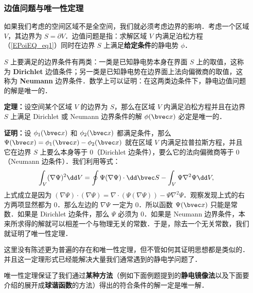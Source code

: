\subsubsection{边值问题与唯一性定理}
如果我们考虑的空间区域不是全空间，我们就必须考虑边界的影响．考虑一个区域 $V$，其边界为 $S=\partial V$．边值问题是指：求解区域 $V$ 内满足泊松方程（\autoref{EPoiEQ_eq1}）同时在边界 $S$ 上满足\textbf{给定条件}的静电势 $\phi$．

$S$ 上要满足的边界条件有两类：一类是已知静电势本身在界面 $S$
上的取值，这称为 \textbf{Dirichlet} 边值条件；另一类是已知静电势在边界面上法向偏微商的取值，这称为 \textbf{Neumann} 边界条件．数学上可以证明：在这两类边条件下，静电边值问题的解是唯一的．

\textbf{定理：}设空间某个区域 $V$ 的边界为 $S$，那么在区域 $V$ 内满足泊松方程并且在边界 $S$ 上满足 Dirichlet 或 Neumann 边界条件的解 $\phi(\bvec x)$ 必定是唯一的．

\textbf{证明：}设 $\phi_1(\bvec x)$ 和 $\phi_2(\bvec x)$ 都满足条件，那么 $\Psi(\bvec x)=\phi_1(\bvec x)-\phi_2(\bvec x)$ 就在区域 $V$ 内满足拉普拉斯方程，并且它在边界 $S$ 上要么本身等于 $0$（Dirichlet 边条件），要么它的法向偏微商等于 $0$（Neumann 边条件）．我们利用等式：
\begin{align}
\int_V (\nabla \Psi)^2 \dd V=\oint \Psi(\nabla \Psi)\cdot \dd \bvec S - \int_V \Psi \nabla^2\Psi \dd V,
\end{align}
上式成立是因为 $(\nabla \Psi)\cdot (\nabla \Psi)=\nabla\cdot (\Psi(\nabla\Psi))-\Psi\nabla^2\Psi$．观察发现上式的右方两项显然都为 $0$．那么左边的 $\nabla\Psi$ 一定为 $0$．所以函数 $\Psi(\bvec x)$ 只能是常数．如果是 Dirichlet 边条件，那么 $\Psi$ 必须为 $0$．如果是 Neumann 边界条件，本来所求得的解就可以相差一个与物理无关的常数．于是，除去一个无关常数，我们就证明了唯一性定理．

这里没有陈述更为普遍的存在和唯一性定理，但不管如何其证明思想都是类似的．并且这一定理形式已经能解决大量我们通常遇到的静电学问题了．

唯一性定理保证了我们通过\textbf{某种方法}（例如下面例题提到的\textbf{静电镜像法}以及下面要介绍的展开成\textbf{球谐函数}的方法）得出的符合条件的解一定是唯一解．

